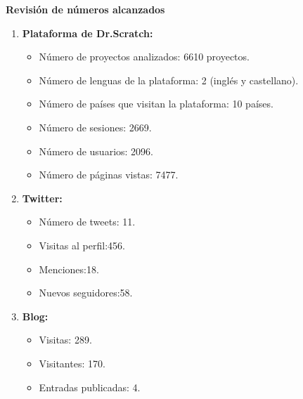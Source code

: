 \documentclass[a4paper,12pt]{letter}
\begin{document}
\begin{letter}
\begin{enumerate}
\end{enumerate}

\vspace{2cm}
\textbf{{\LARGE Revisión de números alcanzados}}
\vspace{0.5cm}

\begin{enumerate}  
    \item {\textbf{Plataforma de Dr.Scratch:}}
        \begin{itemize}
            \item {Número de proyectos analizados: 6610 proyectos.}
            \item {Número de lenguas de la plataforma: 2 (inglés y castellano).}
            \item {Número de países que visitan la plataforma: 10 países.}
            \item {Número de sesiones: 2669.}
            \item {Número de usuarios: 2096.}
            \item {Número de páginas vistas: 7477.}
        \end{itemize}
    \item {\textbf{Twitter:}}
        \begin{itemize}
            \item {Número de tweets: 11.}
            \item {Visitas al perfil:456.}
            \item {Menciones:18.}
            \item {Nuevos seguidores:58.}
        \end{itemize}
    \item {\textbf{Blog:}}
        \begin{itemize}
            \item {Visitas: 289.}
            \item {Visitantes: 170.}
            \item {Entradas publicadas: 4.}
        \end{itemize}

\end{enumerate}

\end{letter}
\end{document}

